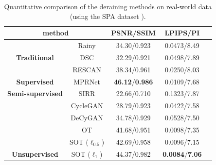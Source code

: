 \documentclass[10pt,journal,compsoc]{IEEEtran}
\begin{document}
\begin{table}[!t]
	\renewcommand\arraystretch{2}
	\footnotesize
	\centering
	\caption{Quantitative comparison of the deraining methods on real-world data (using the SPA dataset  \cite{spa}).}
        \begin{tabular}{|cc|c|c|c|}
		\hline
		\multicolumn{2}{|c|}{\textbf{method}}                                                       & \textbf{PSNR/SSIM}   & \textbf{LPIPS/PI}     \\ \hline
		\multicolumn{1}{|c|}{\textbf{}}                        & Rainy                           & 34.30/0.923                        & 0.0473/8.49                      \\ \hline
		\multicolumn{1}{|c|}{\textbf{Traditional}}                    & DSC\cite{dsc}                            & 32.29/0.921                      & 0.0498/7.89                       \\ \hline
		\multicolumn{1}{|c|}{}                                 & RESCAN\cite{rescan}                         & 38.34/0.961                        & 0.0250/8.03                        \\ \cline{2-4} 
		\multicolumn{1}{|c|}{\multirow{-2}{*}{\textbf{Supervised}}}  & MPRNet\cite{multi}                         & \textbf{46.12}/\textbf{0.986}                        & 0.0109/7.68                      \\ \hline
		\multicolumn{1}{|c|}{\textbf{Semi-supervised}}                   & SIRR\cite{wei2019semi}                           & 22.66/0.710                        & 0.1323/7.87                        \\ \hline
		\multicolumn{1}{|c|}{}                                 & CycleGAN\cite{cyclegan}                       & 28.79/0.923                        & 0.0422/7.58                       \\ \cline{2-4} 
		\multicolumn{1}{|c|}{}                                 & DeCyGAN\cite{deraincyclegan}                 & 34.78/0.929                        & 0.0528/7.50                        \\ \cline{2-4} 
		\multicolumn{1}{|c|}{}                                 & OT\cite{wang2022optimal}                             & 41.68/0.951                        & 0.0098/7.35                        \\ \cline{2-4} 
		\multicolumn{1}{|c|}{}                                 & SOT ($\ell_{0.5}$)                           & 42.69/0.958                        & 0.0096/7.15                       \\ \cline{2-4} 
		\multicolumn{1}{|c|}{\multirow{-5}{*}{\textbf{Unsupervised}}}  &SOT ($\ell_{1}$) &  44.37/0.982 & \textbf{0.0084}/\textbf{7.06} \\ \hline
	\end{tabular}
\end{table}
\end{document}
